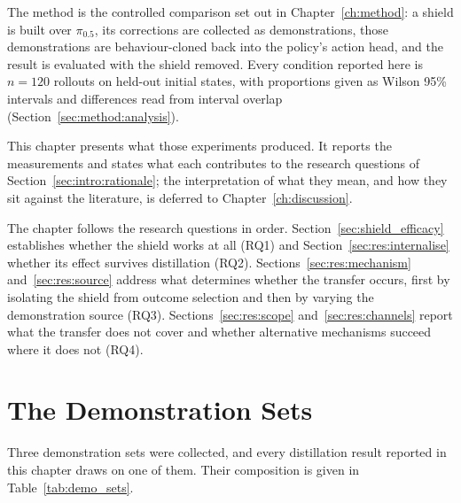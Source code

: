 \documentclass[a4paper,11pt]{report}
\begin{document}
The method is the controlled comparison set out in Chapter~\ref{ch:method}: a shield is built over
$\pi_{0.5}$, its corrections are collected as demonstrations, those demonstrations are
behaviour-cloned back into the policy's action head, and the result is evaluated with the shield
removed. Every condition reported here is $n = 120$ rollouts on held-out initial states, with
proportions given as Wilson 95\% intervals and differences read from interval overlap
(Section~\ref{sec:method:analysis}).

This chapter presents what those experiments produced. It reports the measurements and states what
each contributes to the research questions of Section~\ref{sec:intro:rationale}; the interpretation
of what they mean, and how they sit against the literature, is deferred to
Chapter~\ref{ch:discussion}.

The chapter follows the research questions in order. Section~\ref{sec:shield_efficacy} establishes
whether the shield works at all (RQ1) and Section~\ref{sec:res:internalise} whether its effect
survives distillation (RQ2). Sections~\ref{sec:res:mechanism} and~\ref{sec:res:source} address what
determines whether the transfer occurs, first by isolating the shield from outcome selection and
then by varying the demonstration source (RQ3). Sections~\ref{sec:res:scope}
and~\ref{sec:res:channels} report what the transfer does not cover and whether alternative
mechanisms succeed where it does not (RQ4).

\section{The Demonstration Sets}\label{sec:res:demos}

Three demonstration sets were collected, and every distillation result reported in this chapter
draws on one of them. Their composition is given in Table~\ref{tab:demo_sets}.
\end{document}
